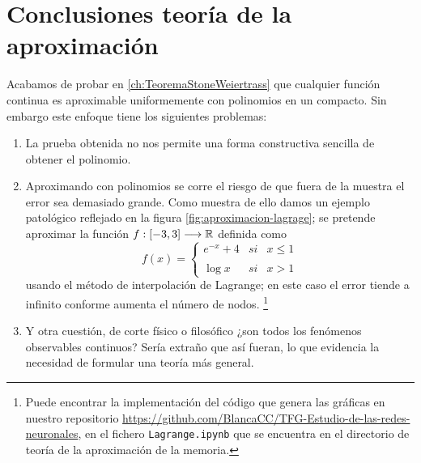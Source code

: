 \section{Conclusiones teoría de la aproximación} 
\label{ch03:conclusiones-teoria-aproximacion}
Acabamos de probar en \ref{ch:TeoremaStoneWeiertrass} que cualquier función 
continua es aproximable uniformemente con polinomios en un compacto. 
Sin embargo este enfoque tiene los siguientes problemas: 

\begin{enumerate}
    \item La prueba obtenida no nos permite 
    una forma constructiva sencilla de obtener el polinomio. 
    \item Aproximando con polinomios se corre el riesgo de que fuera de la muestra 
    el error sea demasiado grande. Como muestra de ello damos un ejemplo patológico 
    reflejado en la figura \ref{fig:aproximacion-lagrage}; se pretende aproximar 
    la función $f:[-3,3] \longrightarrow \mathbb{R}$ definida como
    \begin{equation*}
        f(x)= \left\{ \begin{array}{lcc}
            e^{-x} + 4 &   si  & x \leq 1 \\
            \\ \log{x} &  si  & x > 1
            \end{array}
  \right.
    \end{equation*}
    usando el método de interpolación de Lagrange; en este caso el error tiende a 
    infinito conforme aumenta el número de nodos. \footnote{Puede encontrar la implementación
    del código que genera las gráficas en nuestro repositorio 
    \url{https://github.com/BlancaCC/TFG-Estudio-de-las-redes-neuronales}, 
    en el fichero \texttt{Lagrange.ipynb} que se encuentra  en el directorio de teoría de la aproximación de la memoria. } 

    \item Y otra cuestión, de corte físico o  filosófico ¿son todos los fenómenos observables continuos? 
    Sería extraño que así fueran, lo que evidencia la necesidad de formular una teoría más general. 
\end{enumerate}

